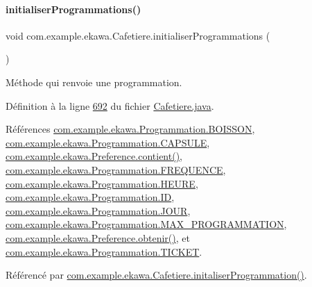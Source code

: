 \mbox{\label{classcom_1_1example_1_1ekawa_1_1_cafetiere_a406e5771edb1663ebb1fc571365b75ac}} 
\paragraph{\texorpdfstring{initialiser\+Programmations()}{initialiserProgrammations()}}
{\footnotesize\ttfamily void com.\+example.\+ekawa.\+Cafetiere.\+initialiser\+Programmations (\begin{DoxyParamCaption}{ }\end{DoxyParamCaption})\hspace{0.3cm}{\ttfamily [private]}}



Méthode qui renvoie une programmation. 



Définition à la ligne \hyperlink{_cafetiere_8java_source_l00692}{692} du fichier \hyperlink{_cafetiere_8java_source}{Cafetiere.\+java}.



Références \hyperlink{_programmation_8java_source_l00027}{com.\+example.\+ekawa.\+Programmation.\+B\+O\+I\+S\+S\+ON}, \hyperlink{_programmation_8java_source_l00026}{com.\+example.\+ekawa.\+Programmation.\+C\+A\+P\+S\+U\+LE}, \hyperlink{_preference_8java_source_l00087}{com.\+example.\+ekawa.\+Preference.\+contient()}, \hyperlink{_programmation_8java_source_l00030}{com.\+example.\+ekawa.\+Programmation.\+F\+R\+E\+Q\+U\+E\+N\+CE}, \hyperlink{_programmation_8java_source_l00029}{com.\+example.\+ekawa.\+Programmation.\+H\+E\+U\+RE}, \hyperlink{_programmation_8java_source_l00025}{com.\+example.\+ekawa.\+Programmation.\+ID}, \hyperlink{_programmation_8java_source_l00028}{com.\+example.\+ekawa.\+Programmation.\+J\+O\+UR}, \hyperlink{_programmation_8java_source_l00023}{com.\+example.\+ekawa.\+Programmation.\+M\+A\+X\+\_\+\+P\+R\+O\+G\+R\+A\+M\+M\+A\+T\+I\+ON}, \hyperlink{_preference_8java_source_l00052}{com.\+example.\+ekawa.\+Preference.\+obtenir()}, et \hyperlink{_programmation_8java_source_l00031}{com.\+example.\+ekawa.\+Programmation.\+T\+I\+C\+K\+ET}.



Référencé par \hyperlink{_cafetiere_8java_source_l00143}{com.\+example.\+ekawa.\+Cafetiere.\+initaliser\+Programmation()}.


